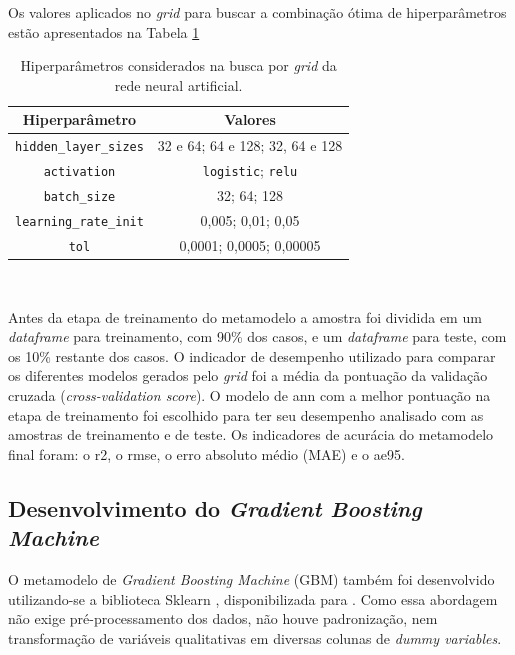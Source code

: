 \documentclass{article}
\begin{document}
Os valores aplicados no \textit{grid} para buscar a combinação ótima de hiperparâmetros estão apresentados na Tabela \ref{table:hiperparemtrosann}

\begin{table}[!htb]
	\centering
	\caption{Hiperparâmetros considerados na busca por \textit{grid} da rede neural artificial.}
	\label{table:hiperparemtrosann}
	\begin{tabular}{|c |c |}
		\hline
		\textbf{Hiperparâmetro} & \textbf{Valores} \\
		\hline
		\texttt{hidden\_layer\_sizes} & 32 e 64; 64 e 128; 32, 64 e 128 \\
		\hline
		\texttt{activation} & \texttt{logistic}; \texttt{relu} \\
		\hline
		\texttt{batch\_size} & 32; 64; 128 \\
		\hline
		\texttt{learning\_rate\_init} & 0,005; 0,01; 0,05  \\
		\hline
		\texttt{tol} & 0,0001; 0,0005; 0,00005 \\
		\hline
	\end{tabular}\\
\end{table}

Antes da etapa de treinamento do metamodelo a amostra foi dividida em um \textit{dataframe} para treinamento, com 90\% dos casos, e um \textit{dataframe} para teste, com os 10\% restante dos casos.
O indicador de desempenho utilizado para comparar os diferentes modelos gerados pelo \textit{grid} foi a média da pontuação da validação cruzada (\textit{cross-validation score}).
O modelo de \acrshort{ann} com a melhor pontuação na etapa de treinamento foi escolhido para ter seu desempenho analisado com as amostras de treinamento e de teste. 
Os indicadores de acurácia do metamodelo final foram: o \acrfull{r2}, o \acrfull{rmse}, o erro absoluto médio (MAE) e o \acrfull{ae95}.

\subsection{Desenvolvimento do \textit{Gradient Boosting Machine}}%

O metamodelo de \textit{Gradient Boosting Machine} (GBM) também foi desenvolvido utilizando-se a biblioteca Sklearn \citep{scikit-learn}, disponibilizada para \citet{Python}.
Como essa abordagem não exige pré-processamento dos dados, não houve padronização, nem transformação de variáveis qualitativas em diversas colunas de \textit{dummy variables}. 
\end{document}
